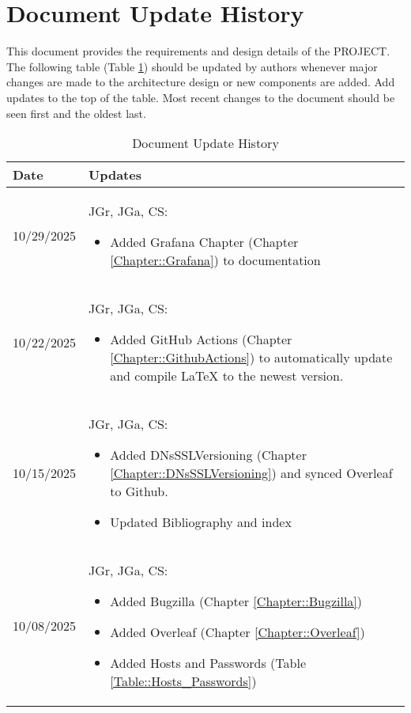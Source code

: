 \section{Document Update History}

This document provides the requirements and design details of the
PROJECT.  The following table (Table \ref{Table::UpdateHistory}) should be
updated by authors whenever major changes are made to the architecture
design or new components are added. Add updates to the top of the table.  
Most recent changes to the document should be seen first and the oldest 
last.

\begin{longtable}{|l||p{12.5cm}|}
\caption{Document Update History \label{Table::UpdateHistory}}\\
\hline
\textbf{Date} & \textbf{Updates} \\
\hline 
\endhead

10/29/2025 & JGr, JGa, CS:
\begin{itemize}[topsep=0pt,itemsep=0pt,parsep=0pt,partopsep=0pt,leftmargin=12pt]
\item Added Grafana Chapter (Chapter \ref{Chapter::Grafana}) to documentation
\end{itemize} 
\\ \hline

10/22/2025 & JGr, JGa, CS:
\begin{itemize}[topsep=0pt,itemsep=0pt,parsep=0pt,partopsep=0pt,leftmargin=12pt]
\item Added GitHub Actions (Chapter \ref{Chapter::GithubActions}) to automatically update and compile LaTeX to the newest version.
\end{itemize} 
\\ \hline

10/15/2025 & JGr, JGa, CS:
\begin{itemize}[topsep=0pt,itemsep=0pt,parsep=0pt,partopsep=0pt,leftmargin=12pt]
\item Added DNsSSLVersioning (Chapter \ref{Chapter::DNsSSLVersioning}) and synced Overleaf to Github.
\item Updated Bibliography and index
\end{itemize} 
\\ \hline

10/08/2025 & JGr, JGa, CS:
\begin{itemize}[topsep=0pt,itemsep=0pt,parsep=0pt,partopsep=0pt,leftmargin=12pt]
\item Added Bugzilla (Chapter \ref{Chapter::Bugzilla})
\item Added Overleaf (Chapter \ref{Chapter::Overleaf})
\item Added Hosts and Passwords (Table \ref{Table::Hosts_Passwords})
\end{itemize} 
\\ \hline


\end{longtable}
